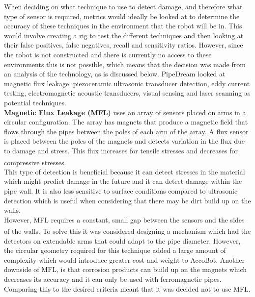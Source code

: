 \documentclass[11pt]{article}		%
\newcommand{\supercite}[1]{\textsuperscript{\cite{#1}}}		%
\begin{document}
        When deciding on what technique to use to detect damage, and therefore what type of sensor is required, metrics would ideally be looked at to determine the accuracy of these techniques in the environment that the robot will be in. This would involve creating a rig to test the different techniques and then looking at their false positives, false negatives, recall and sensitivity ratios. However, since the robot is not constructed and there is currently no access to these environments this is not possible,  which means that the decision was made from an analysis of the technology, as is discussed below. PipeDream looked at magnetic flux leakage, piezoceramic ultrasonic transducer detection, eddy current testing, electromagnetic acoustic transducers, visual sensing and laser scanning as potential techniques.
\\\hspace*{2ex}
	        \textbf{Magnetic Flux Leakage (MFL)} uses an array of sensors placed on arms in a circular configuration. The array has magnets that produce a magnetic field that flows through the pipes between the poles of each arm of the array. A flux sensor is placed between the poles of the magnets and detects variation in the flux due to damage and stress. This flux increases for tensile stresses and decreases for compressive stresses\supercite{MFL_explanation}.
	        \\
            \hspace*{2ex}This type of detection is beneficial because it can detect stresses in the material which might predict damage in the future and it can detect damage within the pipe wall. It is also less sensitive to surface conditions compared to ultrasonic detection which is useful when considering that there may be dirt build up on the walls.
	        \\
            \hspace*{2ex}However, MFL requires a constant, small gap between the sensors and the sides of the walls\supercite{MFL_explanation}. To solve this it was considered designing a mechanism which had the detectors on extendable arms that could adapt to the pipe diameter. However, the circular geometry required for this technique added a large amount of complexity which would introduce greater cost and weight to AccoBot. Another downside of MFL, is that corrosion products can build up on the magnets which decreases its accuracy and it can only be used with ferromagnetic pipes. Comparing this to the desired criteria meant that it was decided not to use MFL. 
\end{document}
